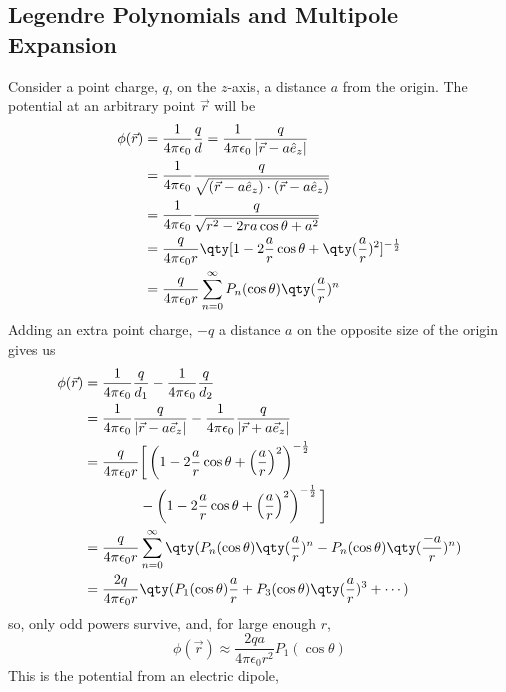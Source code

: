 \subsection{Legendre Polynomials and Multipole Expansion}
\label{sec:multipolelegendre}

Consider a point charge, $q$, on the $z$-axis, a distance $a$ from the
origin. The potential at an arbitrary point $\vec{r}$ will be
\begin{align*}
  \phi(\vec{r}) &= \frac{1}{4 \pi \epsilon_0} \frac{q}{d} = \frac{1}{4 \pi \epsilon_0} \frac{q}{|\vec{r} - a \hat{e}_z|} \\
                &= \frac{1}{4 \pi \epsilon_0} \frac{q}{\sqrt{(\vec{r}-a \hat{e}_z)\cdot(\vec{r}-a \hat{e}_z)}}\\
                &= \frac{1}{4 \pi \epsilon_0} \frac{q}{\sqrt{r^2-2ra \cos \theta + a^2}}\\
                &= \frac{q}{4 \pi \epsilon_0 r} \qty[  1 - 2 \frac{a}{r} \cos \theta + \qty(\frac{a}{r})^2 ]^{-\frac{1}{2}}\\
                &= \frac{q}{4 \pi \epsilon_0 r} \sum_{n=0}^{\infty} P_n(\cos \theta)
  \qty( \frac{a}{r})^n
  \end{align*}
  Adding an extra point charge, $-q$ a distance $a$ on the opposite
  size of the origin gives us
  \begin{align*}
   \phi(\vec{r})  &= \frac{1}{4 \pi \epsilon_0} \frac{q}{d_1} - \frac{1}{4 \pi \epsilon_0} \frac{q}{d_2} \\
                  &= \frac{1}{4 \pi \epsilon_0} \frac{q}{|\vec{r}-a \vec{e}_z|} - \frac{1}{4 \pi \epsilon_0} \frac{q}{|\vec{r}+a \vec{e}_z|} 
\\                &= \frac{q}{4 \pi \epsilon_0 r} \bigg[ \left(1-2 \frac{a}{r} \cos \theta +\left(\frac{a}{r}\right)^2 \right)^{-\frac{1}{2}} 
\\                &  \qquad \qquad -  \left(1-2 \frac{a}{r} \cos \theta +\left(\frac{a}{r}\right)^2 \right)^{-\frac{1}{2}} \bigg] 
\\                &= \frac{q}{4 \pi \epsilon_0 r} \sum_{n=0}^{\infty} \qty( P_n(\cos\theta) \qty( \frac{a}{r} )^n - P_n(\cos \theta) \qty( \frac{-a}{r})^n )
\\                &= \frac{2q}{4 \pi \epsilon_0 r} \qty( P_1 (\cos \theta) \frac{a}{r} + P_3 (\cos \theta) \qty(\frac{a}{r})^3 + \cdots )
    \end{align*}
    so, only odd powers survive, and, for large enough $r$,
    \[ \phi(\vec{r}) \approx \frac{2qa}{4 \pi \epsilon_0 r^2}
    P_1(\cos\theta) \] This is the potential from an electric dipole,
